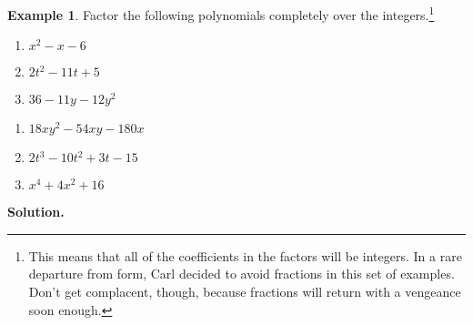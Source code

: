 \documentclass[11pt]{article}
\theoremstyle{definition}  %
\newtheorem{ex}{\bf Example}
\newcounter{HW}
\begin{document}
\begin{ex}\label{advfactoring}  Factor the following polynomials completely over the integers.\footnote{This means that all of the coefficients in the factors will be integers. In a rare departure from form, Carl decided to avoid fractions in this set of examples.  Don't get complacent, though, because fractions will return with a vengeance soon enough.}

\enlargethispage{.1in}

\begin{multicols}{3}

\begin{enumerate}

\item  $x^2 - x - 6$  

\item  $2t^2 - 11t + 5$

\item  $36 - 11y - 12y^2$


\setcounter{HW}{\value{enumi}}

\end{enumerate}

\end{multicols}

\vspace*{-.3in}

\begin{multicols}{3}

\begin{enumerate}

\setcounter{enumi}{\value{HW}}


\item  $18xy^2 - 54xy - 180x$

\item  $2t^3 - 10t^2 + 3t - 15$ 

\item  $x^4 + 4x^2 + 16$

\setcounter{HW}{\value{enumi}}

\end{enumerate}

\end{multicols}

\pagebreak

{\bf Solution.}

\begin{enumerate}


\end{enumerate}
\end{ex}
\end{document}
